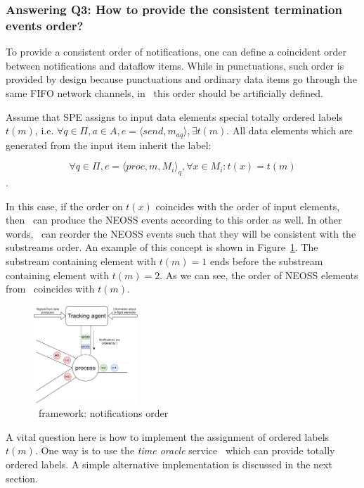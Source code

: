 \subsubsection{Answering Q3: How to provide the consistent termination events order?}
To provide a consistent order of notifications, one can define a coincident order between notifications and dataflow items. While in punctuations, such order is provided by design because punctuations and ordinary data items go through the same FIFO network channels, in \tracker\, this order should be artificially defined.

Assume that SPE assigns to input data elements special totally ordered labels $t(m)$, i.e. $\forall q\in \Pi,a\in A, e=\langle send,m_{aq}\rangle, \exists t(m)$. All data elements which are generated from the input item inherit the label: 

$$\forall q\in \Pi, e=\langle proc,m,M_i\rangle_q, \forall x \in M_i : t(x) = t(m)$$.

In this case, if the order on $t(x)$ coincides with the order of input elements, then \tracker\ can produce the NEOSS events according to this order as well. In other words, \tracker\ can reorder the NEOSS events such that they will be consistent with the substreams order. An example of this concept is shown in Figure~\ref{tracker_ordering}. The substream containing element with $t(m)=1$ ends before the substream containing element with $t(m)=2$. As we can see, the order of NEOSS elements from \tracker\ coincides with $t(m)$.

\begin{figure}[htbp]
  \centering
  \includegraphics[width=0.35\textwidth]{pics/tracker-ordering.pdf}
  \caption{\tracker\ framework: notifications order}
  \label{tracker_ordering}
\end{figure}

A vital question here is how to implement the assignment of ordered labels $t(m)$. One way is to use the {\em time oracle} service~\cite{10.14778/3055330.3055335} which can provide totally ordered labels. A simple alternative implementation is discussed in the next section. 

